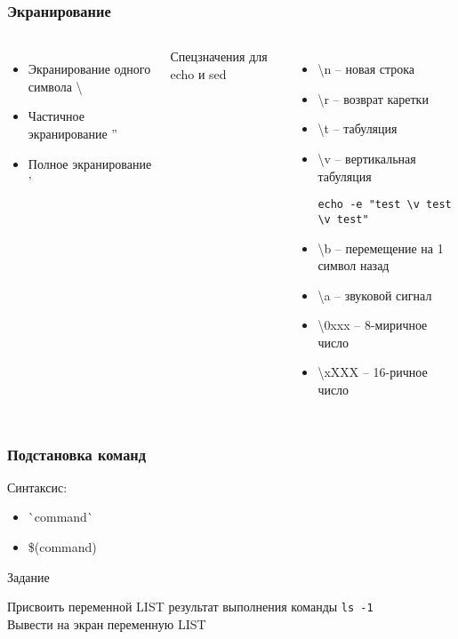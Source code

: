 \begin{frame}[fragile]
	\frametitle{Экранирование}

	\begin{columns}
		\begin{itemize}
			\item Экранирование одного символа \textbackslash 
			\item Частичное экранирование ''
			\item Полное экранирование '
		\end{itemize}
		\pause
		Спецзначения для echo и sed
		\begin{itemize}
			\item \textbackslash{n} -- новая строка
			\item \textbackslash{r} -- возврат каретки
			\item \textbackslash{t} -- табуляция
			\item \textbackslash{v} -- вертикальная табуляция \\
				\small\begin{lstlisting}
echo -e "test \v test \v test"
				\end{lstlisting}
			\item \textbackslash{b} -- перемещение на 1 символ назад
			\item \textbackslash{a} -- звуковой сигнал
			\item \textbackslash{0xxx} -- 8-миричное число
			\item \textbackslash{xXXX} -- 16-ричное число
		\end{itemize}
	\end{columns}

\end{frame}


\begin{frame}
	\frametitle{Подстановка команд}
	
	Синтаксис:

	\begin{itemize}
		\item \`{}command\`{}
		\item \$(command)
	\end{itemize}
	\pause
	\begin{block}{Задание}

		Присвоить переменной LIST результат выполнения команды {\tt ls -1} \\
		Вывести на экран переменную LIST
	\end{block}
\end{frame}


